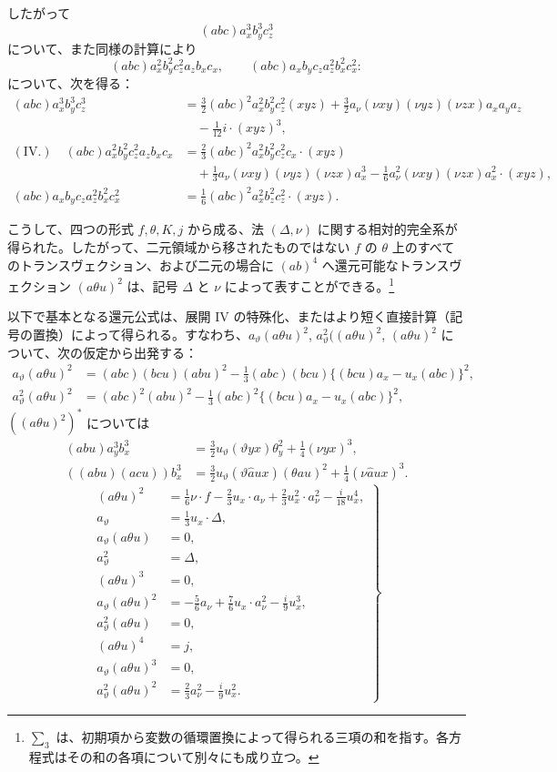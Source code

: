 \documentclass[11pt]{jlreq}
\newcommand{\A}{\Delta}
\begin{document}
したがって
\[
(abc)a_x^3b_y^3c_z^3
\]
について、また同様の計算により
\[
(abc)a_x^2b_y^2c_z^2a_zb_xc_x,\qquad
(abc)a_xb_yc_za_z^2b_x^2c_x^2:
\]
について、次を得る：
\[
\begin{aligned}
(abc)a_x^3b_y^3c_z^3
&=\frac32(abc)^2a_x^2b_y^2c_z^2(xyz)
+\frac32 a_\nu(\nu xy)(\nu yz)(\nu zx)a_xa_ya_z\\
&\quad-\frac1{12}i\cdot(xyz)^3,\\[0.4em]
(\text{IV.})\quad
(abc)a_x^2b_y^2c_z^2a_zb_xc_x
&=\frac23(abc)^2a_x^2b_y^2c_z^2c_x\cdot(xyz)\\
&\quad+\frac13a_\nu(\nu xy)(\nu yz)(\nu zx)a_x^3
-\frac16 a_\nu^2(\nu xy)(\nu zx)a_x^2\cdot(xyz),\\[0.4em]
(abc)a_xb_yc_za_z^2b_x^2c_x^2
&=\frac16(abc)^2a_x^2b_z^2c_z^2\cdot(xyz).
\end{aligned}
\]

こうして、四つの形式 $f,\theta,K,j$ から成る、法 $(\A,\nu)$ に関する相対的完全系が得られた。したがって、二元領域から移されたものではない $f$ の $\theta$ 上のすべてのトランスヴェクション、および二元の場合に $(ab)^4$ へ還元可能なトランスヴェクション $(a\theta u)^2$ は、記号 $\A$ と $\nu$ によって表すことができる。\footnote{$\sum_3$ は、初期項から変数の循環置換によって得られる三項の和を指す。各方程式はその和の各項について別々にも成り立つ。}

以下で基本となる還元公式は、展開 IV の特殊化、またはより短く直接計算（記号の置換）によって得られる。すなわち、$a_\vartheta(a\theta u)^2$, $a_\vartheta^2((a\theta u)^2$, $(a\theta u)^2$ について、次の仮定から出発する：
\[
\begin{aligned}
a_\vartheta(a\theta u)^2
&=(abc)(bcu)(abu)^2-\frac13(abc)(bcu)\{(bcu)a_x-u_x(abc)\}^2,\\
a_\vartheta^2(a\theta u)^2
&=(abc)^2(abu)^2-\frac13(abc)^2\{(bcu)a_x-u_x(abc)\}^2,
\end{aligned}
\]
$((a\theta u)^2)^{*}$ については
\[
\begin{aligned}
(abu)a_y^3b_x^3&=\frac32u_\vartheta(\vartheta yx)\theta_y^2+\frac14(\nu yx)^3,\\
((abu)(acu))b_x^3&=\frac32u_\vartheta(\vartheta\widehat{a}ux)(\theta au)^2+\frac14(\nu\widehat{a}ux)^3.
\end{aligned}
\]
\[
\left.
\begin{aligned}
(a\theta u)^2&=\frac16\nu\cdot f-\frac23u_x\cdot a_\nu
+\frac23u_x^2\cdot a_\nu^2-\frac{i}{18}u_x^4,\\
a_\vartheta&=\frac13u_x\cdot\A,\\
a_\vartheta(a\theta u)&=0,\\
a_\vartheta^2&=\A,\\
(a\theta u)^3&=0,\\
a_\vartheta(a\theta u)^2&=-\frac56a_\nu+\frac76u_x\cdot a_\nu^2-\frac{i}{9}u_x^3,\\
a_\vartheta^2(a\theta u)&=0,\\
(a\theta u)^4&=j,\\
a_\vartheta(a\theta u)^3&=0,\\
a_\vartheta^2(a\theta u)^2&=\frac23a_\nu^2-\frac{i}{9}u_x^2.
\end{aligned}
\right\} \tag{1}
\]
\end{document}
